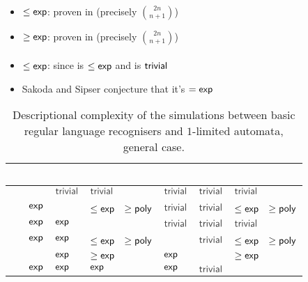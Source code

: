 \paragraph{\TNFA{}\tto\ONFA}
\begin{itemize}
	\item $\le\mathsf{exp}$: proven in \cite{Kap05} (precisely $\binom{2n}{n+1}$)
	\item $\ge\mathsf{exp}$: proven in \cite{Kap05} (precisely $\binom{2n}{n+1}$)
\end{itemize}
\paragraph{\TNFA{}\tto\TDFA}
\begin{itemize}
	\item $\le\mathsf{exp}$: since \hyperref[cost:2NFAto1DFA]{\TNFA{}\tto\ODFA} is $\le\mathsf{exp}$ and \ODFA{}\tto\TDFA is $\mathsf{trivial}$
	\item Sakoda and Sipser conjecture that it's $=\mathsf{exp}$ \cite{SakSip78}
\end{itemize}


\begin{table}
	\centering
	\renewcommand{\hstdef}{.55}
	\begin{tabular}{|l|l|l|p{3.1em}|l|l|p{3.1em}|}
		\hline
		~     & \ODFA              & \ONFA     & \TDFA                                            & \TNFA     & \OLA      & \ODLA                                            \\ \hline
		\ODFA & \cY                & $\Cctriv$ & $\Cctriv$                                        & $\Cctriv$ & $\Cctriv$ & $\Cctriv$                                        \\ \hline
		\ONFA & $\mathsf{exp}$            & \cY       & \cR $\le\Cexp\hst$ $\ge\mathsf{poly}$                   & $\Cctriv$ & $\Cctriv$ & \cB $\le\Cexp\hst$ $\ge\mathsf{poly}$                   \\ \hline
		\TDFA & $\mathsf{exp}$            & $\mathsf{exp}$   & \cY                                              & $\Cctriv$ & $\Cctriv$ & $\Cctriv$                                        \\ \hline
		\TNFA & $\mathsf{exp}$            & $\mathsf{exp}$   & \cR $\le\Cexp\hst$ $\ge\mathsf{poly}$                   & \cY       & $\Cctriv$ & \cB $\le\Cexp\hst$ $\ge\mathsf{poly}$                   \\ \hline
		\OLA  & \rbt[.2]{$\Cdexp$} & $\mathsf{exp}$   & \cG \rbt[.2]{$\le\Cdexp\hst[.1]$} $\ge\Cexp\hst$ & $\mathsf{exp}$   & \cY       & \cG \rbt[.2]{$\le\Cdexp\hst[.1]$} $\ge\Cexp\hst$ \\ \hline
		\ODLA & $\mathsf{exp}$            & $\mathsf{exp}$   & $\mathsf{exp}$                                          & $\mathsf{exp}$   & $\Cctriv$ & \cY                                              \\ \hline
	\end{tabular}
	\caption{Descriptional complexity of the simulations between basic regular language recognisers and $1$-limited automata, general case.}
	\label{tab:sims-1la-general}
\end{table}


